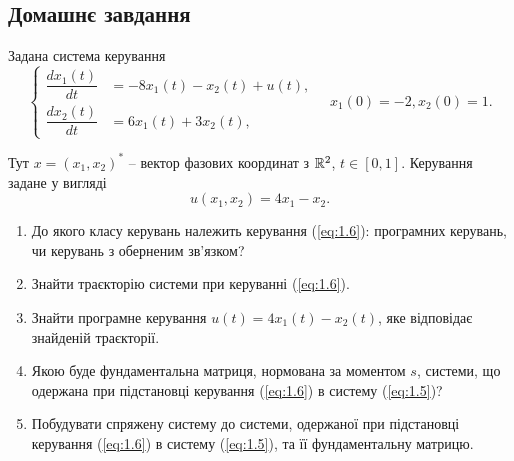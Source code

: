 
\subsection*{Домашнє завдання}

\begin{problem}
	Задана система керування 
	\begin{equation}
		\label{eq:1.5}
		\left\{
			\begin{aligned}
				\dfrac{dx_1(t)}{dt} &= -8x_1(t)  -x_2(t) + u(t),\\
				\dfrac{dx_2(t)}{dt} &= 6x_1(t) + 3x_2(t),
			\end{aligned}
		\right.
		\quad
		x_1(0) = -2, x_2(0) = 1.
	\end{equation}

	Тут $ x =(x_1, x_2)^*$ -- вектор фазових координат з $\mathbb{R}^2$, $t \in [0, 1]$. Керування задане у вигляді
	\begin{equation}
		\label{eq:1.6}
		u(x_1, x_2) = 4x_1 - x_2.
	\end{equation}

	\begin{enumerate}
		\item До якого класу керувань належить керування (\ref{eq:1.6}): програмних керувань, чи керувань з оберненим зв'язком?
		\item Знайти траєкторію системи при керуванні (\ref{eq:1.6}).
		\item Знайти програмне керування $u(t) = 4x_1(t) - x_2(t)$, яке відповідає знайденій траєкторії.
		\item Якою буде фундаментальна матриця, нормована за моментом $s$, системи, що одержана при підстановці керування (\ref{eq:1.6}) в систему (\ref{eq:1.5})?
		\item Побудувати спряжену систему до системи, одержаної при підстановці керування (\ref{eq:1.6}) в систему (\ref{eq:1.5}), та її фундаментальну матрицю.
	\end{enumerate}
\end{problem}

